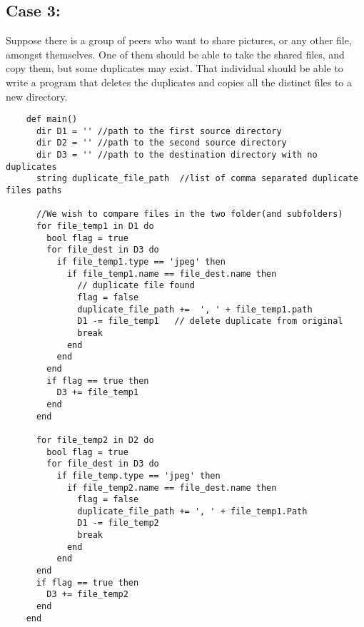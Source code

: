 \documentclass[11pt]{article}
\begin{document}
\newpage
\subsection{Case 3:}
Suppose there is a group of peers who want to share pictures, or any other file, amongst themselves. One of them should be able to take the shared files, and copy them, but some duplicates may exist. That individual should be able to write a program that deletes the duplicates and copies all the distinct files to a new directory.
\begin{listing}[H]
  \begin{verbatim}
    def main()
      dir D1 = '' //path to the first source directory
      dir D2 = '' //path to the second source directory
      dir D3 = '' //path to the destination directory with no duplicates
      string duplicate_file_path  //list of comma separated duplicate files paths

      //We wish to compare files in the two folder(and subfolders)
      for file_temp1 in D1 do
        bool flag = true
        for file_dest in D3 do
          if file_temp1.type == 'jpeg' then
            if file_temp1.name == file_dest.name then
              // duplicate file found
              flag = false
              duplicate_file_path +=  ', ' + file_temp1.path
              D1 -= file_temp1   // delete duplicate from original
              break
            end
          end
        end
        if flag == true then
          D3 += file_temp1
        end
      end

      for file_temp2 in D2 do
        bool flag = true
        for file_dest in D3 do
          if file_temp.type == 'jpeg' then
            if file_temp2.name == file_dest.name then
              flag = false
              duplicate_file_path += ', ' + file_temp1.Path
              D1 -= file_temp2
              break
            end
          end
      end
      if flag == true then
        D3 += file_temp2
      end
    end
  \end{verbatim}
\end{listing}

\newpage
\end{document}
